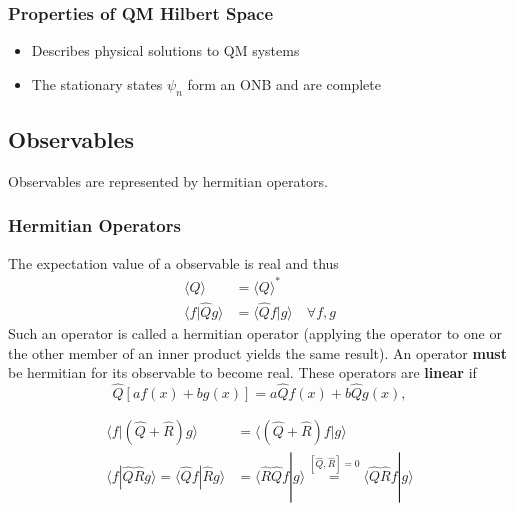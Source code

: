 \subsubsection{Properties of QM Hilbert Space}
\begin{itemize}
    \item Describes physical solutions to QM systems
    \item The stationary states $\psi_n$ form an ONB and are complete
\end{itemize}

\subsection{Observables}
Observables are represented by hermitian operators.
\subsubsection{Hermitian Operators}
The expectation value of a observable is real and thus
\noindent\begin{align*}
    \langle Q\rangle           & = {\langle Q\rangle}^*                       \\
    \langle f|\hat{Q} g\rangle & = \langle \hat{Q}f|g\rangle\quad \forall f,g
\end{align*}
Such an operator is called a hermitian operator (applying the operator to one or the other member of an inner product yields the same result). An operator \textbf{must} be hermitian for its observable to become real. These operators are \textbf{linear} if
\noindent\begin{equation*}
    \hat{Q}\left[af(x)+bg(x)\right]=a\hat{Q}f(x)+b\hat{Q}g(x),
\end{equation*}


\noindent\begin{align*}
    \langle f|(\hat{Q} + \hat{R})g\rangle                                    & = \langle (\hat{Q} + \hat{R})f|g\rangle                                                               \\[0.75em]
    \langle f|\hat{Q}\hat{R}g\rangle       =\langle \hat{Q}f|\hat{R}g\rangle & =  \langle \hat{R}\hat{Q}f|g\rangle \overset{[\hat{Q},\hat{R}]=0}{=} \langle \hat{Q}\hat{R}f|g\rangle
\end{align*}

